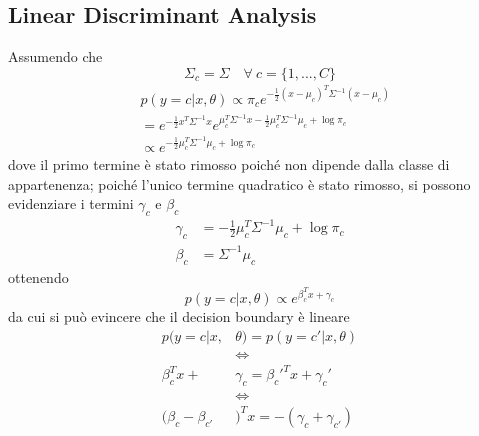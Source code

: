 \documentclass[a4paper,8pt]{article}
\newenvironment{Figure}
  {\par\medskip\noindent\minipage{\linewidth}}
  {\endminipage\par\medskip}
\begin{document}
\begin{multicols}{2}
\subsection{Linear Discriminant Analysis}
Assumendo che 
\begin{equation}
\Sigma_c = \Sigma \quad \forall \ c = \{1, ..., C\}
\end{equation}
\begin{equation}
\begin{split}
&p(y=c|{x}, \theta) \propto  \pi_c e^{-\frac{1}{2}({x} - \mu_{c})^{T}\Sigma^{-1}({x} - \mu_{c})}\\
&= e^{-\frac{1}{2}x^T\Sigma^{-1}x} e^{\mu_c^T\Sigma^{-1}x-\frac{1}{2}\mu_c^T\Sigma^{-1}\mu_c + \log\pi_c}\\
&\propto e^{-\frac{1}{2}\mu_c^T\Sigma^{-1}\mu_c + \log\pi_c}
\end{split}
\end{equation}
dove il primo termine è stato rimosso poiché non dipende dalla classe di appartenenza; poiché l'unico termine quadratico è stato rimosso, si possono evidenziare i termini $\gamma_c$ e $\beta_c$
\begin{equation}
\begin{split}
\gamma_c &= -\frac{1}{2}\mu_c^T\Sigma^{-1}\mu_c + \log\pi_c\\
\beta_c &= \Sigma^{-1}\mu_c
\end{split}
\end{equation}
ottenendo
\begin{equation}
p(y=c|{x}, \theta) \propto e^{\beta_c^Tx+\gamma_c}
\end{equation}
da cui si può evincere che il decision boundary è lineare
\begin{equation}
\begin{split}
p(y=c|{x}, &\theta) = p(y=c'|{x}, \theta) \\
&\iff \\
\beta_c^Tx+&\gamma_c = \beta_c'^Tx+\gamma_c'\\
& \iff\\
(\beta_c - \beta_{c'}&)^Tx = -(\gamma_c + \gamma_{c'})
\end{split}
\end{equation}
\begin{Figure}
 \centering

\end{Figure}
\end{multicols}
\end{document}
